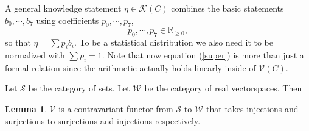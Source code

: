 \documentclass[12pt,a4paper]{article}
\theoremstyle{myrule}
\theoremstyle{postulate}
\theoremstyle{definition}
\newtheorem{lemma}[theorem]{Lemma}
\begin{document}
A general knowledge statement $\eta \in \mathcal{K}(C)$ combines the basic statements $b_\mathit{0}, \cdots, b_\mathit{7}$ using coefficients $p_\mathit{0}, \cdots, p_\mathit{7}$,
\begin{equation}
\label{peq}
  p_\mathit{0},\cdots,p_{\mathit{7}} \in \mathbb{R}_{\ge 0},
\end{equation}
so that $\eta = \sum p_i b_i$.  To be a statistical distribution we also need it to be normalized with $\sum p_i = 1$.  Note that now equation (\ref{super}) is more than just a formal relation since the arithmetic actually holds linearly inside of $\mathcal{V}(C)$.


Let $\mathcal{S}$ be the category of sets.  Let $\mathcal{W}$ be the category of real vectorspaces.  Then
\begin{lemma}
$\mathcal{V}$ is a contravariant functor from $\mathcal{S}$ to $\mathcal{W}$ that takes injections and surjections to surjections and injections respectively.
\end{lemma}
\end{document}
